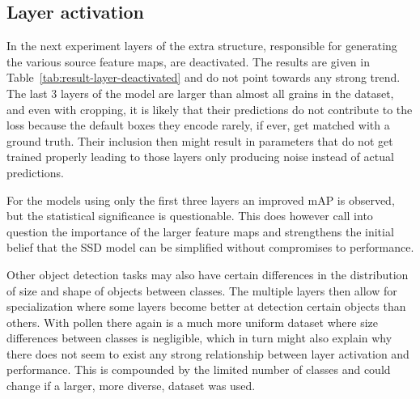 \subsection{Layer activation}
In the next experiment layers of the extra structure, responsible for generating the various source feature maps, are deactivated.
The results are given in Table~\ref{tab:result-layer-deactivated} and do not point towards any strong trend.
The last 3 layers of the model are larger than almost all grains in the dataset, and even with cropping, it is likely that their predictions do not contribute to the loss because the default boxes they encode rarely, if ever, get matched with a ground truth.
Their inclusion then might result in parameters that do not get trained properly leading to those layers only producing noise instead of actual predictions.

For the models using only the first three layers an improved mAP is observed, but the statistical significance is questionable.
This does however call into question the importance of the larger feature maps and strengthens the initial belief that the SSD model can be simplified without compromises to performance.

Other object detection tasks may also have certain differences in the distribution of size and shape of objects between classes.
The multiple layers then allow for specialization where some layers become better at detection certain objects than others.
With pollen there again is a much more uniform dataset where size differences between classes is negligible, which in turn might also explain why there does not seem to exist any strong relationship between layer activation and performance.
This is compounded by the limited number of classes and could change if a larger, more diverse, dataset was used.


